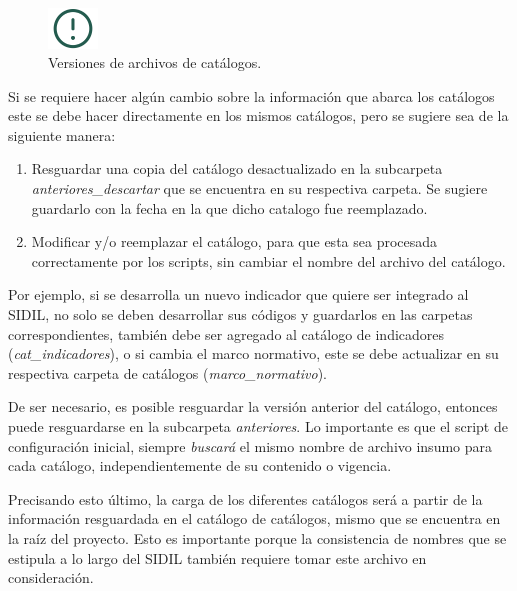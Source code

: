\documentclass[
]{article}
\begin{document}
\begin{figure}
\includegraphics[width=50px,style="float:left; background-color: #fff; padding-right:1em"]{images-1/important-icon} \caption{Versiones de archivos de catálogos.}\label{fig:cambioscatalogos}
\end{figure}

\begin{rmdcomment}
Si se requiere hacer algún cambio sobre la información que abarca los
catálogos este se debe hacer directamente en los mismos catálogos, pero
se sugiere sea de la siguiente manera:

\begin{enumerate}
\def\labelenumi{\arabic{enumi})}
\item
  Resguardar una copia del catálogo desactualizado en la subcarpeta
  \emph{anteriores\_descartar} que se encuentra en su respectiva
  carpeta. Se sugiere guardarlo con la fecha en la que dicho catalogo
  fue reemplazado.
\item
  Modificar y/o reemplazar el catálogo, para que esta sea procesada
  correctamente por los scripts, sin cambiar el nombre del archivo del
  catálogo.
\end{enumerate}

Por ejemplo, si se desarrolla un nuevo indicador que quiere ser
integrado al SIDIL, no solo se deben desarrollar sus códigos y
guardarlos en las carpetas correspondientes, también debe ser agregado
al catálogo de indicadores (\emph{cat\_indicadores}), o si cambia el
marco normativo, este se debe actualizar en su respectiva carpeta de
catálogos (\emph{marco\_normativo}).

De ser necesario, es posible resguardar la versión anterior del
catálogo, entonces puede resguardarse en la subcarpeta
\emph{anteriores}. Lo importante es que el script de configuración
inicial, siempre \emph{buscará} el mismo nombre de archivo insumo para
cada catálogo, independientemente de su contenido o vigencia.

Precisando esto último, la carga de los diferentes catálogos será a
partir de la información resguardada en el catálogo de catálogos, mismo
que se encuentra en la raíz del proyecto. Esto es importante porque la
consistencia de nombres que se estipula a lo largo del SIDIL también
requiere tomar este archivo en consideración.
\end{rmdcomment}
\end{document}
